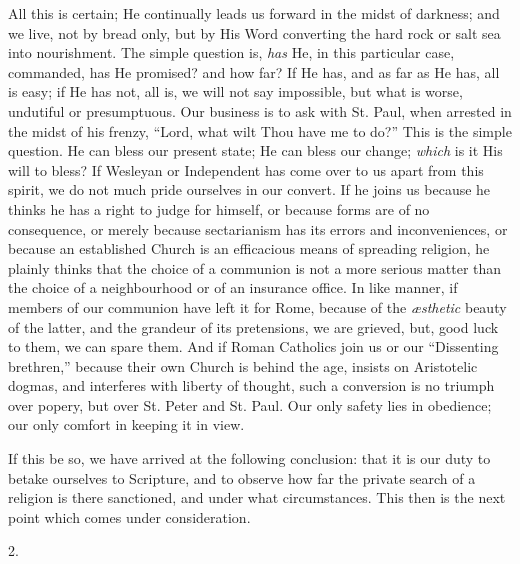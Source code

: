 All this is certain; He continually leads us forward in the midst
of darkness; and we live, not by bread only, but by His Word
converting the hard rock or salt sea into nourishment. The simple
question is, \emph{has} He, in this particular case, commanded, has He
promised? and how far? If He has, and as far as He has, all is easy;
if He has not, all is, we will not say impossible, but what is worse,
undutiful or presumptuous. Our business is to ask with St. Paul, when
arrested in the midst of his frenzy, ``Lord, what wilt Thou have
me to do?'' This is the simple question. He can bless our present
state; He can bless our change; \emph{which} is it His will to bless?
If Wesleyan or Independent has come over to us apart from this spirit,
we do not much pride ourselves in our convert. If he joins us because
he thinks he has a right to judge for himself, or because forms are of
no consequence, or merely because sectarianism has its errors and
inconveniences, or because an established Church is an efficacious
means of spreading religion, he plainly thinks that the choice of a
communion is not a more serious matter than the choice of a
neighbourhood or of an insurance office. In like manner, if members of
our communion have left it for Rome, because of the \emph{æsthetic}
beauty of the latter, and the grandeur of its pretensions, we are
grieved, but, good luck to them, we can spare them. And if Roman
Catholics join us or our ``Dissenting brethren,'' because
their own Church is behind the age, insists on Aristotelic dogmas, and
interferes with liberty of thought, such a conversion is no triumph
over popery, but over St. Peter and St. Paul. Our only safety lies in
obedience; our only comfort in keeping it in view.

If this be so, we have arrived at the following conclusion: that it
is our duty to betake ourselves to Scripture, and to observe how far
the private search of a religion is there sanctioned, and under what
circumstances. This then is the next point which comes under
consideration.

2.

